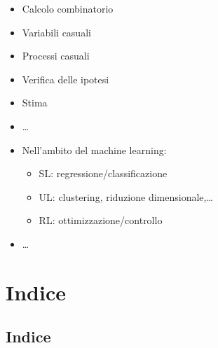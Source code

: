 \documentclass[letterpaper,10pt,italian]{jupyterBook}
\begin{document}
\sphinxAtStartPar
{}
\begin{itemize}
\item {} 
\sphinxAtStartPar
Calcolo combinatorio

\item {} 
\sphinxAtStartPar
Variabili casuali

\item {} 
\sphinxAtStartPar
Processi casuali

\end{itemize}

\sphinxAtStartPar
{}
\begin{itemize}
\item {} 
\sphinxAtStartPar
Verifica delle ipotesi

\item {} 
\sphinxAtStartPar
Stima

\item {} 
\sphinxAtStartPar
…

\item {} 
\sphinxAtStartPar
Nell’ambito del machine learning:
\begin{itemize}
\item {} 
\sphinxAtStartPar
SL: regressione/classificazione

\item {} 
\sphinxAtStartPar
UL: clustering, riduzione dimensionale,…

\item {} 
\sphinxAtStartPar
RL: ottimizzazione/controllo

\end{itemize}

\item {} 
\sphinxAtStartPar
…

\end{itemize}

\sphinxstepscope


\part{Indice}

\sphinxstepscope


\chapter{Indice}
\label{\detokenize{genindex:indice}}\label{\detokenize{genindex::doc}}
\end{document}

